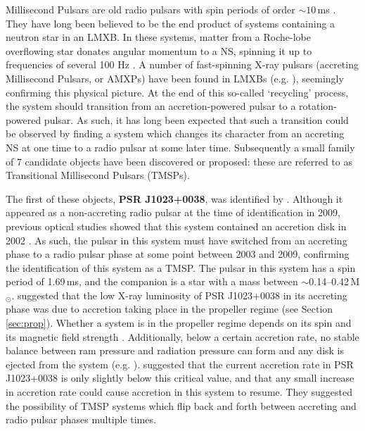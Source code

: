 \par Millisecond Pulsars are old radio pulsars with spin periods of order $\sim10$\,ms \citep{Backer_MSP}. They have long been believed to be the end product of systems containing a neutron star in an LMXB. In these systems, matter from a Roche-lobe overflowing star donates angular momentum to a NS, spinning it up to frequencies of several 100 Hz \citep{Alpar_MSP}. A number of fast-spinning X-ray pulsars (accreting Millisecond Pulsars, or AMXPs) have been found in LMXBs (e.g. \citealp{Wijnands_XRPulsar,Altamirano_Broken,Patruno_AllAMXPs,Sanna_AMXP}), seemingly confirming this physical picture. At the end of this so-called `recycling' process, the system should transition from an accretion-powered pulsar to a rotation-powered pulsar. As such, it has long been expected that such a transition could be observed by finding a system which changes its character from an accreting NS at one time to a radio pulsar at some later time. Subsequently a small family of 7 candidate objects have been discovered or proposed: these are referred to as Transitional Millisecond Pulsars (TMSPs).
\par The first of these objects, \textbf{PSR J1023+0038}, was identified by \citealp{Archibald_Link}. Although it appeared as a non-accreting radio pulsar at the time of identification in 2009, previous optical studies showed that this system contained an accretion disk in 2002 \citep{Szkody_1023Accretion}. As such, the pulsar in this system must have switched from an accreting phase to a radio pulsar phase at some point between 2003 and 2009, confirming the identification of this system as a TMSP. The pulsar in this system has a spin period of 1.69\,ms, and the companion is a star with a mass between $\sim$0.14--0.42\,M$_\odot$. \citealp{Archibald_Link} suggested that the low X-ray luminosity of PSR J1023+0038 in its accreting phase was due to accretion taking place in the propeller regime (see Section \ref{sec:prop}).  Whether a system is in the propeller regime depends on its spin and its magnetic field strength \citep{Lewin_QPORev}. Additionally, below a certain accretion rate, no stable balance between ram pressure and radiation pressure can form and any disk is ejected from the system (e.g. \citealp{Campana_NoDisk}). \citealp{Archibald_Link} suggested that the current accretion rate in PSR J1023+0038 is only slightly below this critical value, and that any small increase in accretion rate could cause accretion in this system to resume. They suggested the possibility of TMSP systems which flip back and forth between accreting and radio pulsar phases multiple times.
